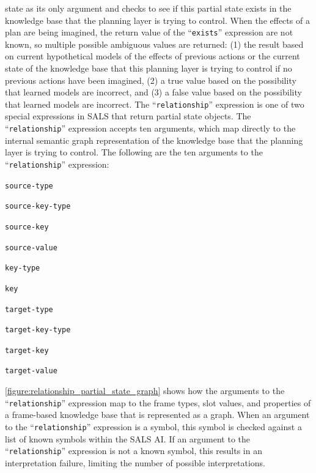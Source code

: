 state as its only argument and checks to see if this partial state
exists in the knowledge base that the planning layer is trying to
control.  When the effects of a plan are being imagined, the return
value of the ``{\tt{exists}}'' expression are not known, so multiple
possible ambiguous values are returned: (1) the result based on
current hypothetical models of the effects of previous actions or the
current state of the knowledge base that this planning layer is trying
to control if no previous actions have been imagined, (2) a true value
based on the possibility that learned models are incorrect, and (3) a
false value based on the possibility that learned models are
incorrect.  The ``{\tt{relationship}}'' expression is one of two
special expressions in SALS that return partial state objects.  The
``{\tt{relationship}}'' expression accepts ten arguments, which map
directly to the internal semantic graph representation of the
knowledge base that the planning layer is trying to control.  The
following are the ten arguments to the ``{\tt{relationship}}''
expression:
\begin{packed_enumerate}
\item{{\tt{source-type}}}
\item{{\tt{source-key-type}}}
\item{{\tt{source-key}}}
\item{{\tt{source-value}}}
\item{{\tt{key-type}}}
\item{{\tt{key}}}
\item{{\tt{target-type}}}
\item{{\tt{target-key-type}}}
\item{{\tt{target-key}}}
\item{{\tt{target-value}}}
\end{packed_enumerate}
{\mbox{\autoref{figure:relationship_partial_state_graph}}} shows how
the arguments to the ``{\tt{relationship}}'' expression map to the
frame types, slot values, and properties of a frame-based knowledge
base that is represented as a graph.  When an argument to the
``{\tt{relationship}}'' expression is a symbol, this symbol is checked
against a list of known symbols within the SALS AI.  If an argument to
the ``{\tt{relationship}}'' expression is not a known symbol, this
results in an interpretation failure, limiting the number of possible
interpretations.
